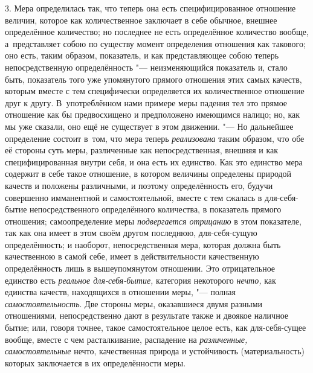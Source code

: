 3. Мера определилась так, что теперь она есть специфицированное отношение
величин, которое как количественное заключает в себе обычное, внешнее
определённое количество; но последнее не есть определённое количество вообще,
а~представляет собою по существу момент определения отношения как такового;
оно есть, таким образом, показатель, и как представляющее собою теперь
непосредственную определённость "--- неизменяющийся показатель и, стало быть,
показатель того уже упомянутого прямого отношения этих самых качеств, которым
вместе с тем специфически определяется их количественное отношение друг к
другу. В~употреблённом нами примере меры падения тел это прямое отношение как
бы предвосхищено и предположено имеющимся налицо; но, как мы уже сказали, оно
ещё не существует в этом движении. "--- Но дальнейшее определение состоит
в~том, что мера теперь {\em реализована} таким образом, что обе её стороны суть
меры, различенные как непосредственная, внешняя и как специфицированная внутри
себя, и она есть их единство. Как это единство мера содержит в себе такое
отношение, в котором величины определены природой качеств и положены
различными, и поэтому определённость его, будучи совершенно имманентной и
самостоятельной, вместе с тем сжалась в для-себя-бытие непосредственного
определённого количества, в показатель прямого отношения; самоопределение меры
{\em подвергается отрицанию} в этом показателе, так как она имеет в этом своём
другом последнюю, для-себя-сущую определённость; и наоборот, непосредственная
мера, которая должна быть качественною в самой себе, имеет в действительности
качественную определённость лишь в вышеупомянутом отношении. Это отрицательное
единство есть {\em реальное для-себя-бытие,} категория некоторого {\em нечто,}
как единства качеств, находящихся в отношении меры, "--- полная
{\em самостоятельность}. Две стороны меры, оказавшиеся двумя разными
отношениями, непосредственно дают в результате также и двоякое наличное бытие;
или, говоря точнее, такое самостоятельное целое есть, как для-себя-сущее
вообще, вместе с чем расталкивание, распадение на {\em различенные,}
{\em самостоятельные} нечто, качественная природа и устойчивость
(материальность) которых заключается в их определённости меры.

